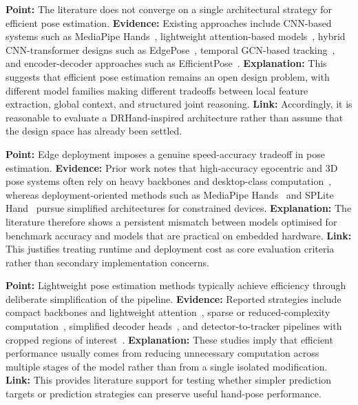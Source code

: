 \documentclass[10pt,letterpaper]{article}
\begin{document}
\medskip
\noindent\textbf{Point:} The literature does not converge on a single architectural strategy for efficient pose estimation.  
\textbf{Evidence:} Existing approaches include CNN-based systems such as MediaPipe Hands~\cite{mediapipe}, lightweight attention-based models~\cite{attentionlite}, hybrid CNN-transformer designs such as EdgePose~\cite{edgepose}, temporal GCN-based tracking~\cite{handobjectgcn}, and encoder-decoder approaches such as EfficientPose~\cite{efficientpose}.  
\textbf{Explanation:} This suggests that efficient pose estimation remains an open design problem, with different model families making different tradeoffs between local feature extraction, global context, and structured joint reasoning.  
\textbf{Link:} Accordingly, it is reasonable to evaluate a DRHand-inspired architecture rather than assume that the design space has already been settled.

\medskip
\noindent\textbf{Point:} Edge deployment imposes a genuine speed-accuracy tradeoff in pose estimation.  
\textbf{Evidence:} Prior work notes that high-accuracy egocentric and 3D pose systems often rely on heavy backbones and desktop-class computation~\cite{everydayegohands}, whereas deployment-oriented methods such as MediaPipe Hands~\cite{mediapipe} and SPLite Hand~\cite{splitehand} pursue simplified architectures for constrained devices.  
\textbf{Explanation:} The literature therefore shows a persistent mismatch between models optimised for benchmark accuracy and models that are practical on embedded hardware.  
\textbf{Link:} This justifies treating runtime and deployment cost as core evaluation criteria rather than secondary implementation concerns.

\medskip
\noindent\textbf{Point:} Lightweight pose estimation methods typically achieve efficiency through deliberate simplification of the pipeline.  
\textbf{Evidence:} Reported strategies include compact backbones and lightweight attention~\cite{attentionlite}, sparse or reduced-complexity computation~\cite{splitehand}, simplified decoder heads~\cite{efficientpose}, and detector-to-tracker pipelines with cropped regions of interest~\cite{mediapipe}.  
\textbf{Explanation:} These studies imply that efficient performance usually comes from reducing unnecessary computation across multiple stages of the model rather than from a single isolated modification.  
\textbf{Link:} This provides literature support for testing whether simpler prediction targets or prediction strategies can preserve useful hand-pose performance.
\end{document}

